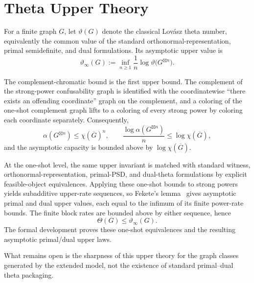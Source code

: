 \section{Theta Upper Theory}\label{sec:theta-theory}

\begin{definition}\label{def:lovasz-theta}
For a finite graph $G$, let $\vartheta(G)$ denote the classical Lov\'asz theta number, equivalently the common value of the standard orthonormal-representation, primal semidefinite, and dual formulations. Its asymptotic upper value is
\[
\vartheta_\infty(G) := \inf_{n\ge 1} \frac{1}{n}\log \vartheta\bigl(G^{\boxtimes n}\bigr).
\]
\end{definition}

The complement-chromatic bound is the first upper bound. The complement of the strong-power confusability graph is identified with the coordinatewise ``there exists an offending coordinate'' graph on the complement, and a coloring of the one-shot complement graph lifts to a coloring of every strong power by coloring each coordinate separately. Consequently,
\[
\alpha(G^{\boxtimes n}) \le \chi(\overline G)^n,
\qquad
\frac{\log \alpha(G^{\boxtimes n})}{n} \le \log \chi(\overline G),
\]
and the asymptotic capacity is bounded above by $\log \chi(\overline G)$.

At the one-shot level, the same upper invariant is matched with standard witness, orthonormal-representation, primal-PSD, and dual-theta formulations by explicit feasible-object equivalences. Applying these one-shot bounds to strong powers yields subadditive upper-rate sequences, so Fekete's lemma~\cite{fekete1923uber} gives asymptotic primal and dual upper values, each equal to the infimum of its finite power-rate bounds. The finite block rates are bounded above by either sequence, hence
\[
\Theta(G)\le \vartheta_{\infty}(G).
\]
The formal development proves these one-shot equivalences and the resulting asymptotic primal/dual upper laws.

What remains open is the sharpness of this upper theory for the graph classes generated by the extended model, not the existence of standard primal--dual theta packaging.
